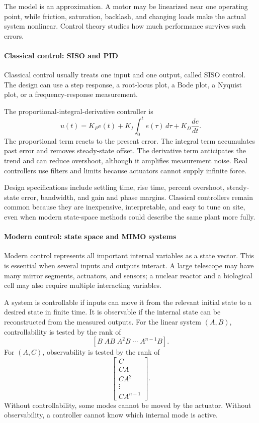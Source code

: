 The model is an approximation. A motor may be linearized near one operating point, while friction, saturation, backlash, and changing loads make the actual system nonlinear. Control theory studies how much performance survives such errors. \cite{control_theory_ref1,control_theory_ref5}

\paragraph{Classical control: SISO and PID}

Classical control usually treats one input and one output, called SISO control. The design can use a step response, a root-locus plot, a Bode plot, a Nyquist plot, or a frequency-response measurement.

The proportional-integral-derivative controller is
\[
 u(t)=K_Pe(t)+K_I\int_0^t e(\tau)\,d\tau+K_D\frac{de}{dt}.
\]
The proportional term reacts to the present error. The integral term accumulates past error and removes steady-state offset. The derivative term anticipates the trend and can reduce overshoot, although it amplifies measurement noise. Real controllers use filters and limits because actuators cannot supply infinite force.

Design specifications include settling time, rise time, percent overshoot, steady-state error, bandwidth, and gain and phase margins. Classical controllers remain common because they are inexpensive, interpretable, and easy to tune on site, even when modern state-space methods could describe the same plant more fully. \cite{control_theory_ref2,control_theory_ref6}

\paragraph{Modern control: state space and MIMO systems}

Modern control represents all important internal variables as a state vector. This is essential when several inputs and outputs interact. A large telescope may have many mirror segments, actuators, and sensors; a nuclear reactor and a biological cell may also require multiple interacting variables.

A system is controllable if inputs can move it from the relevant initial state to a desired state in finite time. It is observable if the internal state can be reconstructed from the measured outputs. For the linear system $(A,B)$, controllability is tested by the rank of
\[
 [B\;AB\;A^2B\;\cdots\;A^{n-1}B].
\]
For $(A,C)$, observability is tested by the rank of
\[
 \begin{bmatrix}C\\CA\\CA^2\\\vdots\\CA^{n-1}\end{bmatrix}.
\]
Without controllability, some modes cannot be moved by the actuator. Without observability, a controller cannot know which internal mode is active.

